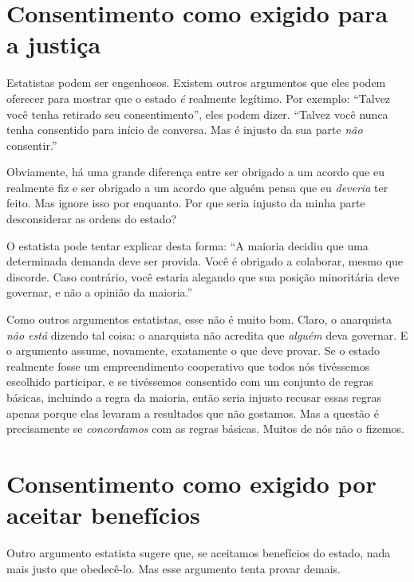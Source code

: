 \section{Consentimento como exigido para a justiça}

Estatistas podem ser engenhosos. Existem outros argumentos que eles podem oferecer para mostrar que o estado \emph{é} realmente legítimo. Por exemplo: ``Talvez você tenha retirado seu consentimento'', eles podem dizer. ``Talvez você nunca tenha consentido para início de conversa. Mas é injusto da sua parte \emph{não} consentir.''

Obviamente, há uma grande diferença entre ser obrigado a um acordo que eu realmente fiz e ser obrigado a um acordo que alguém pensa que eu \emph{deveria} ter feito. Mas ignore isso por enquanto. Por que seria injusto da minha parte desconsiderar as ordens do estado?

O estatista pode tentar explicar desta forma: ``A maioria decidiu que uma determinada demanda deve ser provida. Você é obrigado a colaborar, mesmo que discorde. Caso contrário, você estaria alegando que sua posição minoritária deve governar, e não a opinião da maioria.''

Como outros argumentos estatistas, esse não é muito bom. Claro, o anarquista \emph{não está} dizendo tal coisa: o anarquista não acredita que \emph{alguém} deva governar. E o argumento assume, novamente, exatamente o que deve provar. Se o estado realmente fosse um empreendimento cooperativo que todos nós tivéssemos escolhido participar, e se tivéssemos consentido com um conjunto de regras básicas, incluindo a regra da maioria, então seria injusto recusar essas regras apenas porque elas levaram a resultados que não gostamos. Mas a questão é precisamente se \emph{concordamos} com as regras básicas. Muitos de nós não o fizemos.

\section{Consentimento como exigido por aceitar benefícios}

Outro argumento estatista sugere que, se aceitamos benefícios do estado, nada mais justo que obedecê-lo. Mas esse argumento tenta provar demais.

